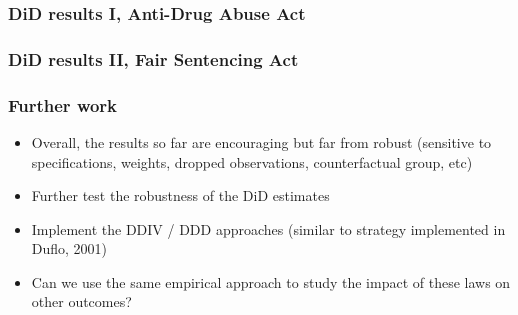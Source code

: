 \documentclass{beamer}
\begin{document}

\begin{frame}
\frametitle{DiD results I, Anti-Drug Abuse Act}

\end{frame}


\begin{frame}
\frametitle{DiD results II, Fair Sentencing Act}



\end{frame}


\begin{frame}
\frametitle{Further work}
\begin{itemize}
    \item Overall, the results so far are encouraging but far from robust (sensitive to specifications, weights, dropped observations, counterfactual group, etc)
    \item Further test the robustness of the DiD estimates
    \item Implement the DDIV / DDD approaches (similar to strategy implemented in Duflo, 2001)
    \item Can we use the same empirical approach to study the impact of these laws on other outcomes?
\end{itemize}
\end{frame}

\end{document}
